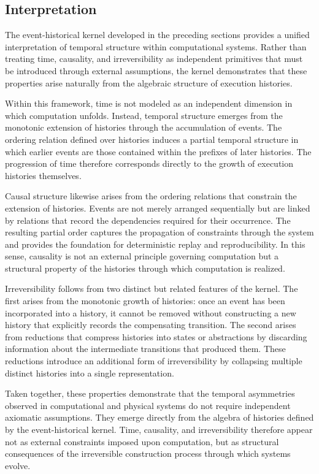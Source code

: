 \documentclass[12pt]{article}
\begin{document}
\subsection{Interpretation}

The event-historical kernel developed in the preceding
sections provides a unified interpretation of temporal
structure within computational systems. Rather than
treating time, causality, and irreversibility as
independent primitives that must be introduced through
external assumptions, the kernel demonstrates that
these properties arise naturally from the algebraic
structure of execution histories.

Within this framework, time is not modeled as an
independent dimension in which computation unfolds.
Instead, temporal structure emerges from the monotonic
extension of histories through the accumulation of
events. The ordering relation defined over histories
induces a partial temporal structure in which earlier
events are those contained within the prefixes of
later histories. The progression of time therefore
corresponds directly to the growth of execution
histories themselves.

Causal structure likewise arises from the ordering
relations that constrain the extension of histories.
Events are not merely arranged sequentially but are
linked by relations that record the dependencies
required for their occurrence. The resulting partial
order captures the propagation of constraints through
the system and provides the foundation for deterministic
replay and reproducibility. In this sense, causality is
not an external principle governing computation but a
structural property of the histories through which
computation is realized.

Irreversibility follows from two distinct but related
features of the kernel. The first arises from the
monotonic growth of histories: once an event has been
incorporated into a history, it cannot be removed
without constructing a new history that explicitly
records the compensating transition. The second arises
from reductions that compress histories into states or
abstractions by discarding information about the
intermediate transitions that produced them. These
reductions introduce an additional form of irreversibility
by collapsing multiple distinct histories into a single
representation.

Taken together, these properties demonstrate that the
temporal asymmetries observed in computational and
physical systems do not require independent axiomatic
assumptions. They emerge directly from the algebra of
histories defined by the event-historical kernel. Time,
causality, and irreversibility therefore appear not as
external constraints imposed upon computation, but as
structural consequences of the irreversible construction
process through which systems evolve.
\end{document}
